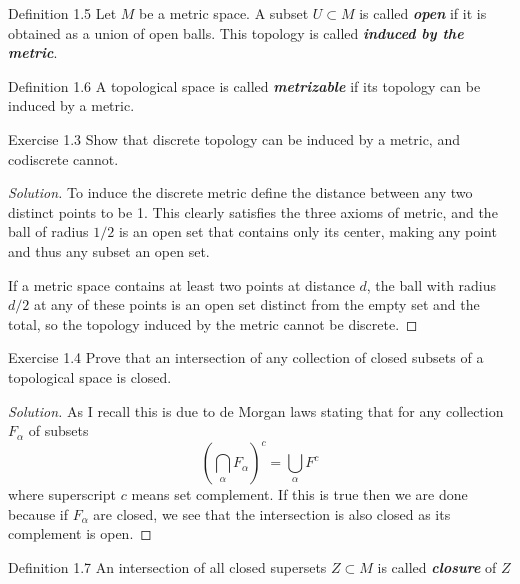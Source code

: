 \begin{thing3}{Definition 1.5}\leavevmode
	Let $M$ be a metric space. A subset $U \subset M$ is called \textit{\textbf{open }} if it is obtained as a union of open balls. This topology is called \textit{\textbf{induced by the metric}}.
\end{thing3}

\begin{thing3}{Definition 1.6}\leavevmode
A topological space is called \textit{\textbf{metrizable}} if its topology can be induced by a metric.	
\end{thing3}

\begin{thing4}{Exercise 1.3}\leavevmode
Show that discrete topology can be induced by a metric, and codiscrete cannot.	
\end{thing4}

\begin{proof}[Solution]\leavevmode
To induce the discrete metric define the distance between any two distinct points to be 1. This clearly satisfies the three axioms of metric, and the ball of radius $1/2$ is an open set that contains only its center, making any point and thus any subset an open set.

If a metric space contains at least two points at distance $d$, the ball with radius $d/2$ at any of these points is an open set distinct from the empty set and the total, so the topology induced by the metric cannot be discrete.
\end{proof}

\begin{thing4}{Exercise 1.4}\leavevmode
	Prove that an intersection of any collection of closed subsets of a topological space is closed.
\end{thing4}

\begin{proof}[Solution]\leavevmode
As I recall this is due to de Morgan laws stating that for any collection $F_\alpha$ of subsets
\begin{equation}\label{eq:1}\left( \bigcap_\alpha F_\alpha  \right)^c=\bigcup_{\alpha} F^c\end{equation}
where superscript $c$ means set complement. If this is true then we are done because if $F_\alpha$ are closed, we see that the intersection is also closed as its complement is open.

\end{proof}

\begin{thing3}{Definition 1.7}\leavevmode
	An intersection of all closed supersets $Z \subset M$ is called \textit{\textbf{closure}} of $Z$
\end{thing3}

